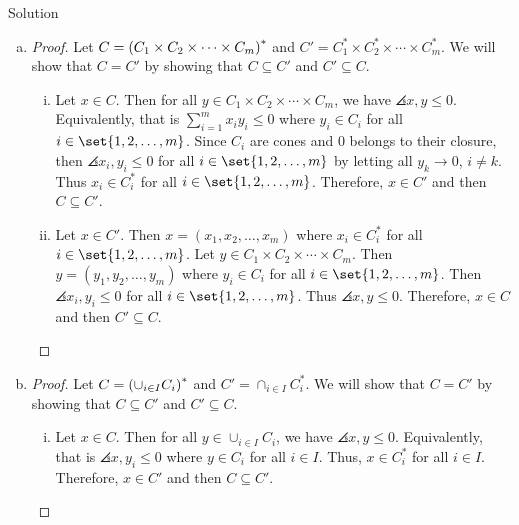 \documentclass{article}
\begin{document}
\begin{solution}
    {Solution}
    \begin{enumerate}[(a)]
        \item {
            \begin{proof}
                Let $C=\parens*{C_1 \times C_2 \times \cdots \times C_m}^*$ and $C' = C_1^*\times C_2^* \times \cdots \times C_m^*$. We will show that $C=C'$ by showing that $C\subseteq C'$ and $C'\subseteq C$.
                \begin{enumerate}[(i)]
                    \item {
                        Let $x\in C$. Then for all $y\in C_1\times C_2\times\cdots\times C_m$, we have $\angles{x,y}\leq 0$. Equivalently, that is $\sum_{i=1}^{m}x_i y_i\leq0$ where $y_i\in C_i$ for all $i\in\set{1,2,\ldots,m}$. Since $C_i$ are cones and $0$ belongs to their closure,  then $\angles{x_i,y_i}\leq 0$ for all $i\in\set{1,2,\ldots,m}$ by letting all $y_k\rightarrow 0$, $i\neq k$. Thus $x_i\in C_i^*$ for all $i\in\set{1,2,\ldots,m}$. Therefore, $x\in C'$ and then $C\subseteq C'$.
                    }
                    \item {
                        Let $x\in C'$. Then $x=(x_1,x_2,\ldots,x_m)$ where $x_i\in C_i^*$ for all $i\in\set{1,2,\ldots,m}$. Let $y\in C_1\times C_2\times\cdots\times C_m$. Then $y=(y_1,y_2,\ldots,y_m)$ where $y_i\in C_i$ for all $i\in\set{1,2,\ldots,m}$. Then $\angles{x_i,y_i}\leq 0$ for all $i\in\set{1,2,\ldots,m}$. Thus $\angles{x,y}\leq 0$. Therefore, $x\in C$ and then $C'\subseteq C$.
                    }
                \end{enumerate}
            \end{proof}
        }
        \item {
            \begin{proof}
                Let $C=\parens*{\cup_{i\in I}C_i}^*$ and $C'=\cap_{i\in I}C_i^*$. We will show that $C=C'$ by showing that $C\subseteq C'$ and $C'\subseteq C$.
                \begin{enumerate}[(i)]
                    \item {
                        Let $x\in C$. Then for all $y\in \cup_{i\in I}C_i$, we have $\angles{x,y}\leq 0$. Equivalently, that is $\angles{x,y_i}\leq0$ where $y\in C_i$ for all $i\in I$. Thus, $x\in C_i^*$ for all $i\in I$. Therefore, $x\in C'$ and then $C\subseteq C'$.
}
\end{enumerate}
\end{proof}}
\end{enumerate}
\end{solution}
\end{document}
